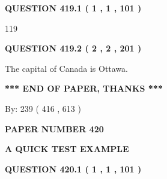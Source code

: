 \documentclass[12pt]{article}
\begin{document}
{\textbf{\Large{QUESTION
419.1 
 ( 1 , 1 , 101 )
}}}
  
  
 
 
\noindent{}

119
 
 
  
\vspace{0.2in}
  
{\textbf{\Large{QUESTION
419.2 
 ( 2 , 2 , 201 )
}}}
  
  
 
 
\noindent{}
 
 
The capital of Canada is Ottawa.
 
 
 
 
   
   
 \vspace{0.2in}
 
   
   
   
   
\vspace{1.0in} 
{\textbf{\large{ *** END OF PAPER, THANKS *** }}} 
   
   
\hspace{1.0in} By: 
 239 ( 416 ,  613 )
   
   
   
   
\newpage 
\setcounter{page}{ 
   420001 } 
   
   
   
   
 {\textbf{ \Large{ PAPER NUMBER  420  }}}
   
   
\vspace{0.2in}
   
   
   
   
   
   
 \vspace{0.2in}
{\LARGE {\textbf{ A QUICK TEST EXAMPLE}}}
   
   
  
\vspace{0.2in}
  
{\textbf{\Large{QUESTION
420.1 
 ( 1 , 1 , 101 )
}}}
  
  
 
 
\noindent{}
\end{document}
